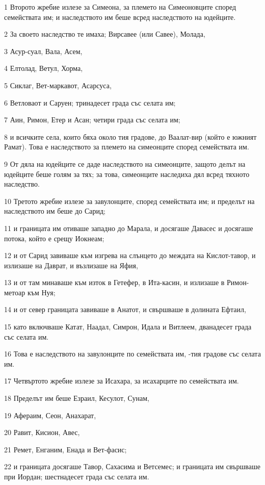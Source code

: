 \par 1 Второто жребие излезе за Симеона, за племето на Симеоновците според семействата им; и наследството им беше всред наследството на юдейците.
\par 2 За своето наследство те имаха; Вирсавее (или Савее), Молада,
\par 3 Асур-суал, Вала, Асем,
\par 4 Елтолад, Ветул, Хорма,
\par 5 Сиклаг, Вет-маркавот, Асарсуса,
\par 6 Ветловаот и Саруен; тринадесет града със селата им;
\par 7 Аин, Римон, Етер и Асан; четири града със селата им;
\par 8 и всичките села, които бяха около тия градове, до Ваалат-вир (който е южният Рамат). Това е наследството за племето на симеонците според семействата им.
\par 9 От дяла на юдейците се даде наследството на симеонците, защото делът на юдейците беше голям за тях; за това, симеонците наследиха дял всред тяхното наследство.
\par 10 Третото жребие излезе за завулонците, според семействата им; и пределът на наследството им беше до Сарид;
\par 11 и границата им отиваше западно до Марала, и досягаше Давасес и досягаше потока, който е срещу Иокнеам;
\par 12 и от Сарид завиваше към изгрева на слънцето до междата на Кислот-тавор, и излизаше на Даврат, и възлизаше на Яфия,
\par 13 и от там минаваше към изток в Гетефер, в Ита-касин, и излизаше в Римон-метоар към Нуя;
\par 14 и от север границата завиваше в Анатот, и свършваше в долината Ефтаил,
\par 15 като включваше Катат, Наадал, Симрон, Идала и Витлеем, дванадесет града със селата им.
\par 16 Това е наследството на завулонците по семействата им, -тия градове със селата им.
\par 17 Четвъртото жребие излезе за Исахара, за исахарците по семействата им.
\par 18 Пределът им беше Езраил, Кесулот, Сунам,
\par 19 Афераим, Сеон, Анахарат,
\par 20 Равит, Кисион, Авес,
\par 21 Ремет, Енганим, Енада и Вет-фасис;
\par 22 и границата досягаше Тавор, Сахасима и Ветсемес; и границата им свършваше при Иордан; шестнадесет града със селата им.
